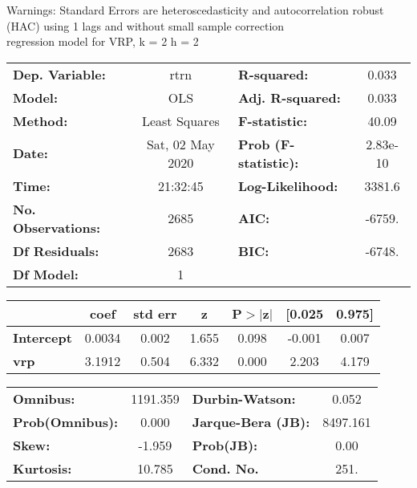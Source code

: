 Warnings: \newline
 [1] Standard Errors are heteroscedasticity and autocorrelation robust (HAC) using 1 lags and without small sample correction\\ 

regression model for VRP, k = 2 h = 2\begin{center}
\begin{tabular}{lclc}
\toprule
\textbf{Dep. Variable:}    &       rtrn       & \textbf{  R-squared:         } &     0.033   \\
\textbf{Model:}            &       OLS        & \textbf{  Adj. R-squared:    } &     0.033   \\
\textbf{Method:}           &  Least Squares   & \textbf{  F-statistic:       } &     40.09   \\
\textbf{Date:}             & Sat, 02 May 2020 & \textbf{  Prob (F-statistic):} &  2.83e-10   \\
\textbf{Time:}             &     21:32:45     & \textbf{  Log-Likelihood:    } &    3381.6   \\
\textbf{No. Observations:} &        2685      & \textbf{  AIC:               } &    -6759.   \\
\textbf{Df Residuals:}     &        2683      & \textbf{  BIC:               } &    -6748.   \\
\textbf{Df Model:}         &           1      & \textbf{                     } &             \\
\bottomrule
\end{tabular}
\begin{tabular}{lcccccc}
                   & \textbf{coef} & \textbf{std err} & \textbf{z} & \textbf{P$> |$z$|$} & \textbf{[0.025} & \textbf{0.975]}  \\
\midrule
\textbf{Intercept} &       0.0034  &        0.002     &     1.655  &         0.098        &       -0.001    &        0.007     \\
\textbf{vrp}       &       3.1912  &        0.504     &     6.332  &         0.000        &        2.203    &        4.179     \\
\bottomrule
\end{tabular}
\begin{tabular}{lclc}
\textbf{Omnibus:}       & 1191.359 & \textbf{  Durbin-Watson:     } &    0.052  \\
\textbf{Prob(Omnibus):} &   0.000  & \textbf{  Jarque-Bera (JB):  } & 8497.161  \\
\textbf{Skew:}          &  -1.959  & \textbf{  Prob(JB):          } &     0.00  \\
\textbf{Kurtosis:}      &  10.785  & \textbf{  Cond. No.          } &     251.  \\
\bottomrule
\end{tabular}
\end{center}

